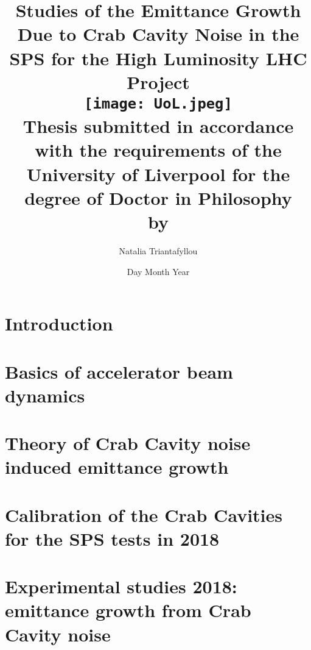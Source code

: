 \documentclass[12pt,twoside]{report} %
\begin{document}
\frontmatter
\title{
{Studies of the Emittance Growth Due to Crab Cavity Noise in the SPS for the High Luminosity LHC Project}\\
{\texttt{[image: UoL.jpeg]}} \\
{\large Thesis submitted in accordance with the requirements of the University of Liverpool for the degree of Doctor in Philosophy \\ by}
}
\author{ Natalia Triantafyllou}
\date{Day Month Year}
\maketitle
\newpage




\listoffigures
{}
\listoftables
{}

\newpage

\thispagestyle{plain} %

\listofsymbols
{}

\tableofcontents

\mainmatter

\chapter{Introduction}


\chapter{Basics of accelerator beam dynamics}


\chapter{Theory of Crab Cavity noise induced emittance growth}\label{Ch:CC_noise_theory}


\chapter{Calibration of the Crab Cavities for the SPS tests in 2018}\label{Ch:CC_set_up}


\chapter{Experimental studies 2018: emittance growth from Crab Cavity noise}\label{Ch:2018_analyisis}

\end{document}
